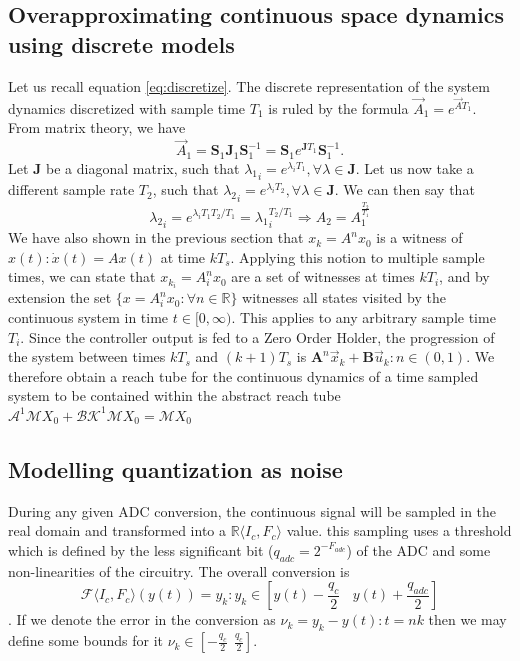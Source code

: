 \documentclass[runningheads,a4paper]{llncs}
\newcommand{\mat}[1]{\boldsymbol{#1}}
\begin{document}
\subsection{Overapproximating continuous space dynamics using discrete models}
Let us recall equation \ref{eq:discretize}. The discrete representation of the system dynamics discretized with sample time $T_1$ is ruled by the formula
$\vec{A}_1 = e^{\vec{A} T_1}$. From matrix theory, we have 
\begin{equation}
\vec{A}_1 = \mat{S}_1\mat{J}_1\mat{S}_1^{-1}= \mat{S}_1e^{\mat{J} T_1}\mat{S}_1^{-1}.
\end{equation}
Let $\mat{J}$ be a diagonal matrix, such that ${\lambda_1}_i=e^{\lambda_i T_1}, \forall \lambda \in \mat{J}$.
Let us now take a different sample rate $T_2$, such that ${\lambda_2}_i=e^{\lambda_i T_2}, \forall \lambda \in \mat{J}$. We can then say that 
\begin{equation}
{\lambda_2}_i=e^{\lambda_i T_1 T_2/T_1}={\lambda_1}_i^{T_2/T_1} \Rightarrow A_2=A_1^{\frac{T_2}{T_1}}
\end{equation}
We have also shown in the previous section that $x_k=A^nx_0$ is a witness of $x(t): \dot{x}(t)=Ax(t)$ at time $kT_s$. Applying this notion to multiple sample times, we can state that $x_{k_i}=A_i^nx_0$ are a set of witnesses at times $kT_i$, and by extension the set $\{x=A_i^nx_0 : \forall n \in \mathbb{R} \}$ witnesses all states visited by the continuous system in time $t \in [0,\infty)$. This applies to any arbitrary sample time $T_i$.
Since the controller output is fed to a Zero Order Holder, the progression of the system between times $kT_s$ and $(k+1)T_s$ is $\mat{A}^n\vec{x}_k+\mat{B}\vec{u}_k : n \in (0,1)$. We therefore obtain a reach tube for the continuous dynamics of a time sampled system to be contained within the abstract reach tube $\mathcal{A}^1\mathcal{M}X_0+\mathcal{BK}^1\mathcal{M}X_0=\mathcal{M}X_0$
\subsection{Modelling quantization as noise} \label{appendix:quantization-noise}

During any given ADC conversion, the continuous signal will be sampled in the real domain and transformed into a $\mathbb{R}\langle I_{c},F_{c} \rangle$ value. this sampling uses a threshold which is defined by the less significant bit ($q_{adc}=2^{-F_{adc}}$) of the ADC and some non-linearities of the circuitry. The overall conversion is
$$\mathcal{F}\langle I_{c},F_{c} \rangle(y(t)) = y_k : y_k \in \left[y(t)-\frac{q_{c}}{2}\ \ \ \ y(t)+\frac{q_{adc}}{2}\right]$$.
If we denote the error in the conversion as $\nu_k=y_k-y(t) : t=nk$ then we may define some bounds for it $\nu_k \in [-\frac{q_{c}}{2}\ \ \frac{q_{c}}{2}]$.
\end{document}
